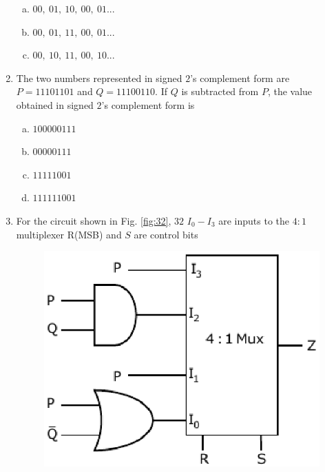 \documentclass[journal,12pt,twocolumn]{IEEEtran}
\begin{document}
\begin{enumerate}
\begin{enumerate}[(a)]
\item $ 00,\ 01,\ 10,\ 00,\ 01 ... $

\item $ 00,\ 01,\ 11,\ 00,\ 01 ... $

\item $ 00,\ 10,\ 11,\ 00,\ 10 ... $

\end{enumerate}
 
\item The two numbers represented in signed $2$'s complement form are $P=11101101$ and $Q=11100110$. If $Q$ is subtracted from $P$, the value obtained in signed $2$'s complement form is 

\begin{enumerate}[(a)]

\item $ 100000111 $

\item $ 00000111 $

\item $ 11111001 $

\item $ 111111001 $

\end{enumerate}

\item For the circuit shown in Fig. \ref{fig:32}, $32$ $I_0 - I_3$ are inputs to the $4:1$ multiplexer R(MSB) and $S$ are control bits

\begin{figure}

\centering

\includegraphics[width=\columnwidth]{./figs/37.eps}


\end{figure}
\end{enumerate}
\end{document}
